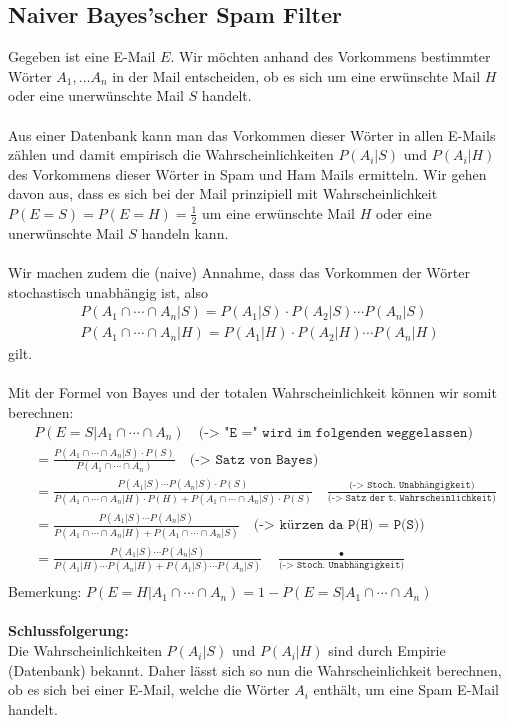 \documentclass[a4paper]{article}
\begin{document}
\subsection{Naiver Bayes'scher Spam Filter}
Gegeben ist eine E-Mail $E$.  Wir möchten anhand des Vorkommens bestimmter Wörter $A_1, \ldots A_n$ in der Mail entscheiden, ob es sich um eine erwünschte Mail $H$ oder eine unerwünschte Mail $S$ handelt.\\\\
Aus einer Datenbank kann man das Vorkommen dieser Wörter in allen E-Mails zählen und damit empirisch die Wahrscheinlichkeiten $P(A_i | S)$ und $P(A_i | H) $ des Vorkommens dieser Wörter in Spam und Ham Mails ermitteln.  Wir gehen davon aus, dass es sich bei der Mail  prinzipiell mit  Wahrscheinlichkeit $P(E= S) = P(E= H)= \frac{1}{2}$  um eine erwünschte  Mail $H$ oder eine unerwünschte Mail $S$  handeln kann. \\\\
 Wir machen zudem die (naive) Annahme, dass das Vorkommen der Wörter  stochastisch unabhängig ist, also 
\begin{align*}
P(A_1 \cap \cdots \cap A_n | S) = P(A_1 | S) \cdot P(A_2 | S) \cdots P(A_n | S) \\
P(A_1 \cap \cdots \cap A_n | H) = P(A_1 | H) \cdot P(A_2 | H) \cdots P(A_n | H)
\end{align*}
gilt.\\\\
Mit der Formel von Bayes und der totalen Wahrscheinlichkeit  können wir somit berechnen:
\begin{align*}
& P(E=S |  A_1 \cap \cdots \cap A_n) \quad \texttt{(-> "E =" wird im folgenden weggelassen)}\\[5pt]
&= \frac{P(A_1 \cap \cdots \cap A_n | S) \cdot P(S)}{P(A_1 \cap \cdots \cap A_n)} \quad \texttt{(-> Satz von Bayes)}\\[5pt]
&=  \frac{P(A_1 | S) \cdots P(A_n | S) \cdot P(S)}{P(A_1 \cap \cdots \cap A_n | H) \cdot P(H) + P(A_1 \cap \cdots \cap A_n | S) \cdot P(S)} \quad \frac{\texttt{(-> Stoch. Unabhängigkeit)}}{\texttt{(-> Satz der t. Wahrscheinlichkeit)}} \\[5pt]
&=  \frac{P(A_1 | S) \cdots P(A_n | S)}{P(A_1 \cap \cdots \cap A_n | H) + P(A_1 \cap \cdots \cap A_n | S)} \quad \texttt{(-> kürzen da P(H) = P(S))} \\[5pt]
&=  \frac{P(A_1 | S) \cdots P(A_n | S)}{P(A_1 | H) \cdots P(A_n | H)  + P(A_1 | S) \cdots P(A_n | S) } \quad \frac{•}{\texttt{(-> Stoch. Unabhängigkeit)}} \\
\end{align*}
Bemerkung: $P(E=H |  A_1 \cap \cdots \cap A_n) = 1- P(E=S |  A_1 \cap \cdots \cap A_n) $\\\\
\textbf{Schlussfolgerung:}\\
Die Wahrscheinlichkeiten $P(A_i | S)$ und $P(A_i | H) $ sind durch Empirie (Datenbank) bekannt. Daher lässt sich so nun die Wahrscheinlichkeit berechnen, ob es sich bei einer E-Mail, welche die Wörter $A_i$ enthält, um eine Spam E-Mail handelt.
\end{document}
